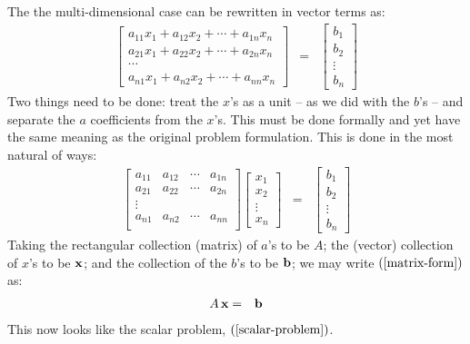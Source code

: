 \documentclass{article}
\begin{document}
The the multi-dimensional case can be rewritten in vector terms as:
\begin{eqnarray}
  \left[
  \begin{array}{c}
  a_{11} x_1 + a_{12} x_2 + \cdots + a_{1n} x_n \\
  a_{21} x_1 + a_{22} x_2 + \cdots + a_{2n} x_n \\
  \cdots  \\
    a_{n1} x_1 + a_{n2} x_2 + \cdots + a_{nn} x_n
  \end{array}
  \right] & = & \left[
                 \begin{array}{c}
                   b_1 \\
                   b_2 \\
                   \vdots \\
                   b_n
                 \end{array}
   \right] \label{vector-form}
\end{eqnarray}
Two things need to be done: treat the $x$'s as a unit -- as we did with the
$b$'s -- and separate the $a$ coefficients from the $x$'s. This must be done formally
and yet have the same meaning as the original problem formulation.
This is done in the most natural of ways:
\begin{eqnarray}
  \left[
  \begin{array}{cccc}
    a_{11} & a_{12} & \cdots & a_{1n} \\
    a_{21} & a_{22} & \cdots & a_{2n} \\
    \vdots \\
    a_{n1} & a_{n2} & \cdots & a_{nn} \\
    \end{array}
  \right]
  \left[
  \begin{array}{c}
    x_1 \\
    x_2 \\
    \vdots \\
    x_n
  \end{array}
  \right] & = &
                \left[
                \begin{array}{c}
                  b_1 \\
                  b_2 \\
                  \vdots \\
                  b_n
                \end{array}
  \right] \label{matrix-form}
\end{eqnarray}
Taking the rectangular collection (matrix) of $a$'s to be $A$; the (vector) collection
of $x$'s to be ${\bf x}$; and the collection of the $b$'s to be ${\bf b}$;
we may write $(\ref{matrix-form})$ as:
\begin{eqnarray}
  A \, {\bf x} & = & {\bf b} \label{concise-matrix-form}
\end{eqnarray}
This now looks like the scalar problem, $(\ref{scalar-problem})$.
\end{document}
